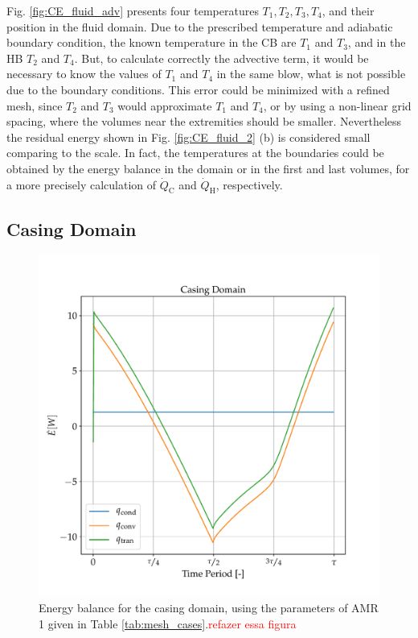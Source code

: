 \documentclass[review,preprint,12pt]{elsarticle}
\begin{document}
Fig. \ref{fig:CE_fluid_adv} presents four temperatures $T_1, T_2, T_3, T_4$, and their position in the fluid domain. Due to the prescribed temperature and adiabatic boundary condition, the known temperature in the CB are $T_1$ and $T_3$, and in the HB $T_2$ and $T_4$. But, to calculate correctly the advective term, it would be necessary to know the values of $T_1$ and $T_4$ in the same blow, what is not possible due to the boundary conditions. This error could be minimized with a refined mesh, since $T_2$ and $T_3$ would approximate $T_1$ and $T_4$, or by using a non-linear grid spacing, where the volumes near the extremities should be smaller. Nevertheless the residual energy shown in Fig. \ref{fig:CE_fluid_2} (b) is considered small comparing to the scale. In fact, the temperatures at the boundaries could be obtained by the energy balance in the domain or in the first and last volumes, for a more precisely calculation of $\dot{Q}_\textrm{C}$ and $\dot{Q}_\textrm{H}$, respectively.

\subsection{Casing Domain}


\begin{figure}[!ht]
  \centering
  \includegraphics[scale=0.6]{CE_casing_1.pdf}
  \caption{Energy balance for the casing domain, using the parameters of AMR 1 given in Table \ref{tab:mesh_cases}.\textcolor{red}{refazer essa figura}}
  \label{fig:CE_csg_1}
\end{figure}
\end{document}
